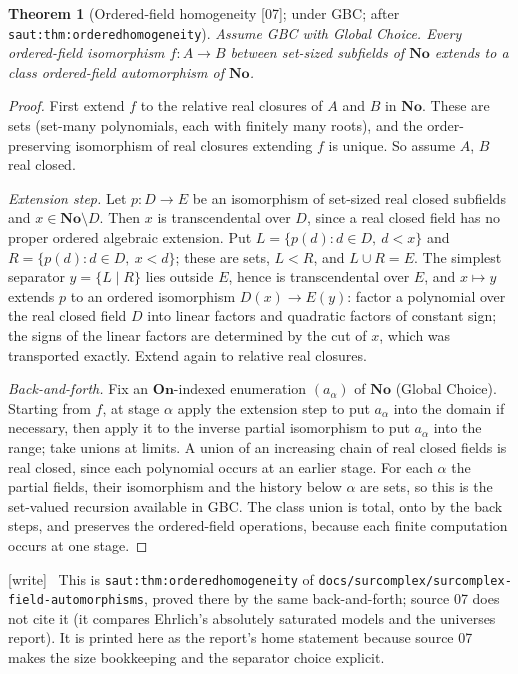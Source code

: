 \documentclass[11pt,a4paper]{article}
\numberwithin{equation}{section}
\theoremstyle{plain}
\newtheorem{theorem}{Theorem}[section]
\theoremstyle{definition}
\theoremstyle{remark}
\newcommand{\No}{\mathbf{No}}
\newcommand{\On}{\mathbf{On}}
\newcommand{\lbl}[1]{\nolinkurl{#1}}%
\newcommand{\fn}[1]{\nolinkurl{#1}}%
\newcommand{\src}[1]{\textup{\textsf{\small[#1]}}}%
\newcommand{\wtag}{\textup{\textsf{[write]}}}%
\newenvironment{wnote}{\par\smallskip\noindent\wtag\ }{\par\smallskip}
\begin{document}
\begin{theorem}[Ordered-field homogeneity \src{07}; under GBC; after \lbl{saut:thm:orderedhomogeneity}]\label{sse:an:fnd:thm:homogeneity}
Assume GBC with Global Choice. Every ordered-field isomorphism $f:A\to B$
between set-sized subfields of $\No$ extends to a class ordered-field
automorphism of $\No$.
\end{theorem}
\begin{proof}
First extend $f$ to the relative real closures of $A$ and $B$ in $\No$.
These are sets (set-many polynomials, each with finitely many roots), and the
order-preserving isomorphism of real closures extending $f$ is unique. So
assume $A$, $B$ real closed.

\emph{Extension step.} Let $p:D\to E$ be an isomorphism of set-sized real
closed subfields and $x\in\No\setminus D$. Then $x$ is transcendental over
$D$, since a real closed field has no proper ordered algebraic extension.
Put $L=\{p(d):d\in D,\ d<x\}$ and $R=\{p(d):d\in D,\ x<d\}$; these are sets,
$L<R$, and $L\cup R=E$. The simplest separator $y=\{L\mid R\}$ lies outside
$E$, hence is transcendental over $E$, and $x\mapsto y$ extends $p$ to an
ordered isomorphism $D(x)\to E(y)$: factor a polynomial over the real closed
field $D$ into linear factors and quadratic factors of constant sign; the
signs of the linear factors are determined by the cut of $x$, which was
transported exactly. Extend again to relative real closures.

\emph{Back-and-forth.} Fix an $\On$-indexed enumeration $(a_\alpha)$ of $\No$
(Global Choice). Starting from $f$, at stage $\alpha$ apply the extension
step to put $a_\alpha$ into the domain if necessary, then apply it to the
inverse partial isomorphism to put $a_\alpha$ into the range; take unions at
limits. A union of an increasing chain of real closed fields is real closed,
since each polynomial occurs at an earlier stage. For each $\alpha$ the
partial fields, their isomorphism and the history below $\alpha$ are sets,
so this is the set-valued recursion available in GBC. The class union is
total, onto by the back steps, and preserves the ordered-field operations,
because each finite computation occurs at one stage.
\end{proof}
\begin{wnote}
This is \lbl{saut:thm:orderedhomogeneity} of
\fn{docs/surcomplex/surcomplex-field-automorphisms}, proved there by the same
back-and-forth; source 07 does not cite it (it compares Ehrlich's absolutely
saturated models \cite{an-EhrlichAbsolute} and the universes report). It is
printed here as the report's home statement because source 07 makes the
size bookkeeping and the separator choice explicit.
\end{wnote}
\end{document}
